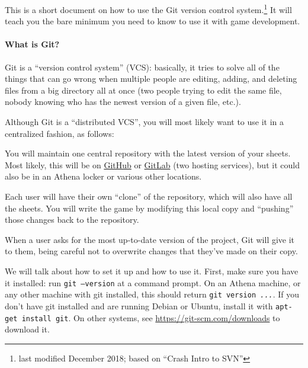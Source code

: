 \documentclass[green]{testgame}
\begin{document}
\newcommand{\webbase}{https://adehnert.gitlab.io/TestGame}

\newcommand{\ter}[1]{\fbox{\parbox{6.5in}{{\tt #1}}}}


This is a short document on how to use the Git version control
system.\footnote{last modified December 2018; based on ``Crash Intro to SVN''} It will teach you the
bare minimum you need to know to use it with game development.

\paragraph*{What is Git?}

Git is a ``version control system'' (VCS): basically,
it tries to solve all of the things that can go wrong when multiple
people are editing, adding, and deleting files from a big directory all
at once (two people trying to edit the same file, nobody knowing who
has the newest version of a given file, etc.).

Although Git is a ``distributed VCS'', you will most likely want to use it in a centralized fashion, as follows:


\begin{itemz}[]

\item You will maintain one central repository with the latest version of your sheets. Most likely, this will be on \href{https://github.com}{GitHub} or \href{https://gitlab.com}{GitLab} (two hosting services), but it could also be in an Athena locker or various other locations.

\item Each user will have their own ``clone'' of the repository, which will also have all the sheets. You will write the game by modifying this local copy and ``pushing'' those changes back to the repository.

\item When a user asks for the most up-to-date version of the project, Git will give it to them, being careful not to overwrite changes that they've made on their copy.

\end{itemz}

We will talk about how to set it up and how to use it. First, make sure you have it installed: run \texttt{git --version} at a command prompt. On an Athena machine, or any other machine with git installed, this should return \texttt{git version \textit{...}}. If you don't have git installed and are running Debian or Ubuntu, install it with \texttt{apt-get install git}. On other systems, see \url{https://git-scm.com/downloads} to download it.
\end{document}
